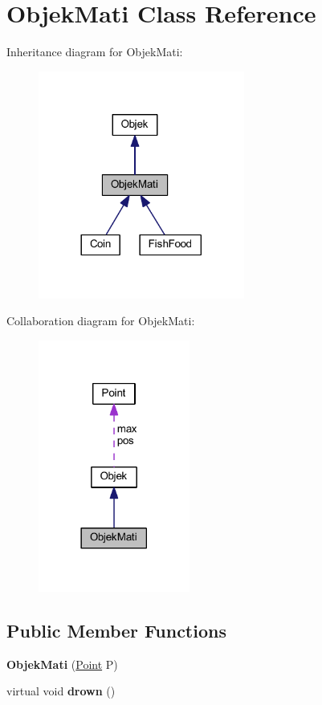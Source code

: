 \hypertarget{class_objek_mati}{}\section{Objek\+Mati Class Reference}
\label{class_objek_mati}


Inheritance diagram for Objek\+Mati\+:\nopagebreak
\begin{figure}[H]
\begin{center}
\leavevmode
\includegraphics[width=192pt]{class_objek_mati__inherit__graph}
\end{center}
\end{figure}


Collaboration diagram for Objek\+Mati\+:\nopagebreak
\begin{figure}[H]
\begin{center}
\leavevmode
\includegraphics[width=141pt]{class_objek_mati__coll__graph}
\end{center}
\end{figure}
\subsection*{Public Member Functions}
\begin{DoxyCompactItemize}
\item 
\mbox{\label{class_objek_mati_a4dc54dc2f5a9c6f3d7a6e692c5dd3b52}} 
{\bfseries Objek\+Mati} (\mbox{\hyperlink{class_point}{Point}} P)
\item 
\mbox{\label{class_objek_mati_ae95bd4f88da6861ddff7c129cf873f31}} 
virtual void {\bfseries drown} ()
\end{DoxyCompactItemize}
